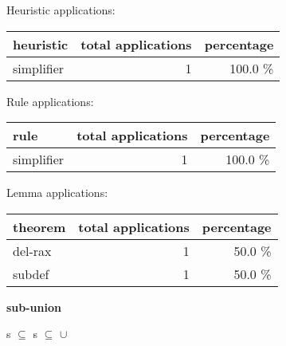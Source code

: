 \documentclass[a4paper]{article}
\begin{document}
\medskip


Heuristic applications:

\begin{supertabular}{l|r|r}
heuristic	& total applications & percentage \\ \hline
simplifier & 1 & 100.0 \% \\

\end{supertabular}

Rule applications:

\begin{supertabular}{l|r|r}
rule	        & total applications & percentage \\ \hline
simplifier & 1 & 100.0 \% \\

\end{supertabular}

Lemma applications:

\begin{supertabular}{l|r|r}
theorem	        & total applications & percentage \\ \hline
del-rax & 1 & 50.0 \% \\
subdef & 1 & 50.0 \% \\

\end{supertabular}
\pagebreak

{\LARGE\bf sub-union}\label{lemma-sub-union}

\medskip

 \Fol s $\subseteq$  \Imp s $\subseteq$  $\cup$ 
\end{document}

